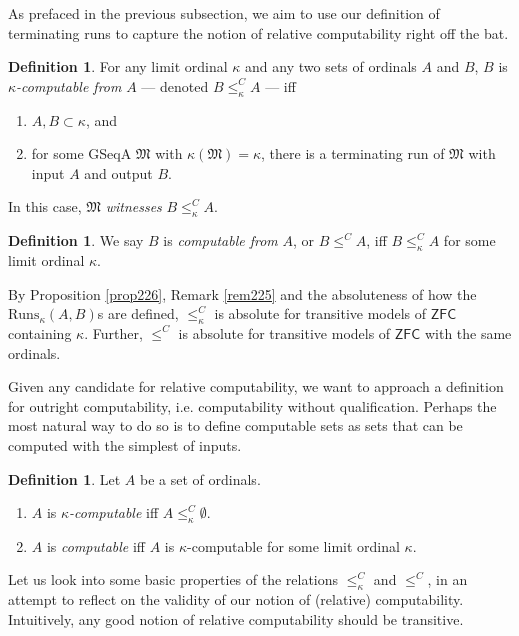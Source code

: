 \documentclass[12pt, twoside]{memoir}
\numberwithin{equation}{section}
\theoremstyle{definition}
\newtheorem{defi}[thm]{Definition}
\theoremstyle{remark}
\theoremstyle{definition}
\theoremstyle{definition}
\theoremstyle{definition}
\theoremstyle{remark}
\begin{document}
As prefaced in the previous subsection, we aim to use our definition of terminating runs to capture the notion of relative computability right off the bat.

\begin{defi}
For any limit ordinal $\kappa$ and any two sets of ordinals $A$ and $B$, $B$ is $\kappa$\emph{-computable from} $A$ --- denoted $B \leq^C_{\kappa} A$ --- iff
\begin{enumerate}[label=(\alph*)]
    \item $A, B \subset \kappa$, and
    \item for some GSeqA $\mathfrak{M}$ with $\kappa(\mathfrak{M}) = \kappa$, there is a terminating run of $\mathfrak{M}$ with input $A$ and output $B$. 
\end{enumerate}
In this case, $\mathfrak{M}$ \emph{witnesses} $B \leq^C_{\kappa} A$.
\end{defi}

\begin{defi}
We say $B$ is \emph{computable from} $A$, or $B \leq^C A$, iff $B \leq^C_{\kappa} A$ for some limit ordinal $\kappa$.
\end{defi}

By Proposition \ref{prop226}, Remark \ref{rem225} and the absoluteness of how the $\mathrm{Runs}_{\kappa}(A, B)$s are defined, $\leq^C_{\kappa}$ is absolute for transitive models of $\mathsf{ZFC}$ containing $\kappa$. Further, $\leq^C$ is absolute for transitive models of $\mathsf{ZFC}$ with the same ordinals. 

Given any candidate for relative computability, we want to approach a definition for outright computability, i.e. computability without qualification. Perhaps the most natural way to do so is to define computable sets as sets that can be computed with the simplest of inputs. 

\begin{defi}
Let $A$ be a set of ordinals.
\begin{enumerate}[label=(\arabic*)]
    \item $A$ is $\kappa$\emph{-computable} iff $A \leq^C_{\kappa} \emptyset$.
    \item $A$ is \emph{computable} iff $A$ is $\kappa$-computable for some limit ordinal $\kappa$.
\end{enumerate}
\end{defi}

Let us look into some basic properties of the relations $\leq^C_{\kappa}$ and $\leq^C$, in an attempt to reflect on the validity of our notion of (relative) computability. Intuitively, any good notion of relative computability should be transitive. 
\end{document}
